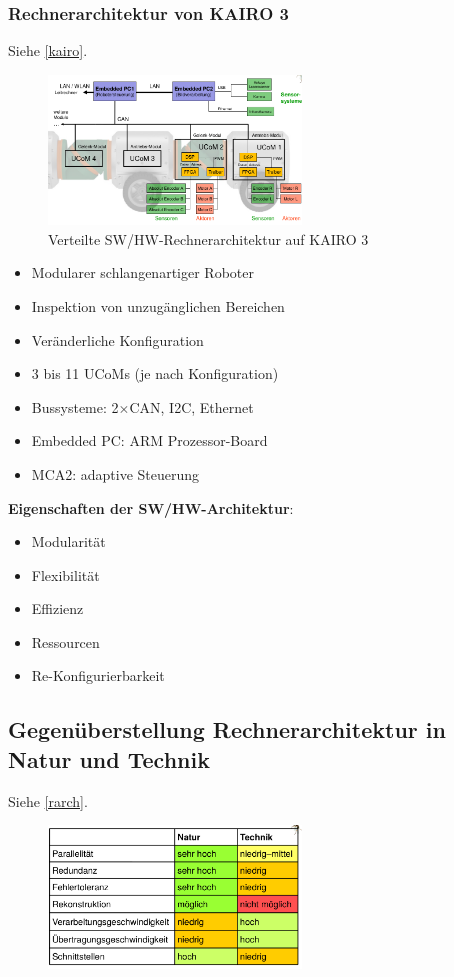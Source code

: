 \subsubsection{Rechnerarchitektur von KAIRO 3}
Siehe \autoref{kairo}.
\begin{figure}[h!]
	\centering
	\includegraphics[width=0.6\textwidth]{figures/ch07_kairo-3.png}
	\caption{Verteilte SW/HW-Rechnerarchitektur auf KAIRO 3}
	\label{kairo}
\end{figure}
\begin{itemize}
\item Modularer schlangenartiger Roboter
\item Inspektion von unzugänglichen Bereichen
\item Veränderliche Konfiguration
\item 3 bis 11 UCoMs (je nach Konfiguration)
\item Bussysteme: 2$\times$CAN, I2C, Ethernet
\item Embedded PC: ARM Prozessor-Board
\item MCA2: adaptive Steuerung
\end{itemize}
\textbf{Eigenschaften der SW/HW-Architektur}:
\begin{itemize}
\item Modularität
\item Flexibilität
\item Effizienz
\item Ressourcen
\item Re-Konfigurierbarkeit
\end{itemize}
\subsection{Gegenüberstellung Rechnerarchitektur in Natur und Technik}
Siehe \autoref{rarch}.
\begin{figure}[h!]
	\centering
	\includegraphics[width=0.6\textwidth]{figures/ch07_rechnerarchitektur.png}
	\caption{}
	\label{rarch}
\end{figure}